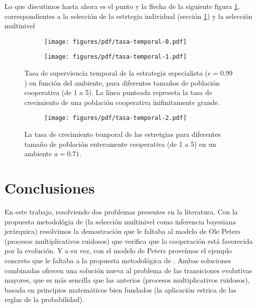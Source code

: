 \documentclass[a4paper,10pt]{article}
\begin{document}
Lo que discutimos hasta ahora es el punto y la flecha de la siguiente figura \ref{}, correspondientes a la selección de la estrtegia individual (sección \ref{}) y la selección multinivel 


\begin{figure}[H]
    \centering
    \begin{subfigure}[b]{0.66\textwidth}
    \texttt{[image: figures/pdf/tasa-temporal-0.pdf]}
    \end{subfigure}
    \caption{}
    \label{fig:fitness_temporal}
\end{figure}


\begin{figure}[H]
    \centering
    \begin{subfigure}[b]{0.66\textwidth}
    \texttt{[image: figures/pdf/tasa-temporal-1.pdf]}
    \end{subfigure}
    \caption{
    Tasa de superviencia temporal de la estrategia especialista ($e=0.99$) en función del ambiente, para diferentes tamaños de población cooperativa (de 1 a 5).
    La línea punteada represeta la tasa de crecimiento de una población cooperativa inifinitamente grande.
    }
    \label{fig:multilevel-selection-1}
\end{figure}


\begin{figure}[H]
    \centering
    \begin{subfigure}[b]{0.66\textwidth}
    \texttt{[image: figures/pdf/tasa-temporal-2.pdf]}
    \end{subfigure}
    \caption{
    La tasa de crecimiento temporal de las estretgias para diferentes tamaño de población enteramente cooperativa (de 1 a 5) en un ambiente $a=0.71$.
    }
    \label{fig:multilevel-selection-1}
\end{figure}




\section{Conclusiones}

En este trabajo, resolviendo dos problemas presentes en la literatura.
Con la propuesta metodológia de \cite{czegel2019-bayesianEvolution} (la selección multinivel como inferencia bayesiana jerárquica) resolvimos la demostración que le faltaba al modelo de Ole Peters (procesos multiplicativos ruidosos) que verifica que la cooperación está favorecida por la evolución.
Y a su vez, con el modelo de Peters proveímos el ejemplo concreto que le faltaba a la propuesta metodológica de \cite{czegel2019-bayesianEvolution}.
Ambas soluciones combinadas ofrecen una solución nueva al problema de las transiciones evolutivas mayores, que es más sencilla que las anterios (procesos multiplicativos ruidosos), basada en principios matemáticos bien fundados (la aplicación estrica de las reglas de la probabilidad).
\end{document}
